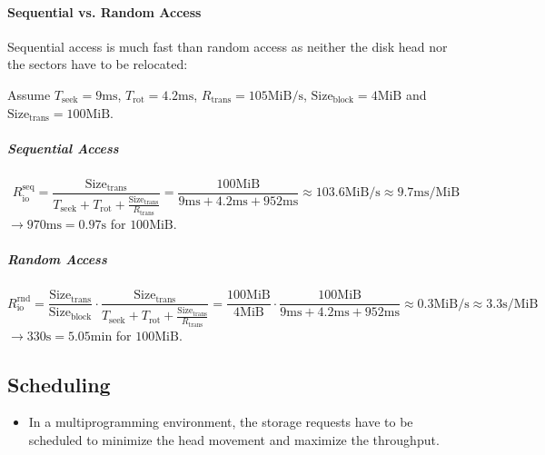 \documentclass[a4paper, 11pt, accentcolor = tud3b]{tudreport}
\begin{document}
		        \paragraph{Sequential vs. Random Access}
			        Sequential access is much fast than random access as neither the disk head nor the sectors have to be relocated:
			        
			        Assume \( T_\textrm{seek} = 9\textrm{ms} \), \( T_\textrm{rot} = 4.2\textrm{ms} \), \( R_\textrm{trans} = 105\textrm{MiB/s} \), \( \textrm{Size}_\textrm{block} = 4\textrm{MiB} \) and \( \textrm{Size}_\textrm{trans} = 100\textrm{MiB} \).
			        
			        \subparagraph{Sequential Access}
			        \begin{equation*}
				        R_\textrm{io}^\textrm{seq} = \frac{\textrm{Size}_\textrm{trans}}{T_\textrm{seek} + T_\textrm{rot} + \frac{\textrm{Size}_\textrm{trans}}{R_\textrm{trans}}} = \frac{100\textrm{MiB}}{9\textrm{ms} + 4.2\textrm{ms} + 952\textrm{ms}} \approx 103.6\textrm{MiB/s} \approx 9.7\textrm{ms/MiB}
			        \end{equation*}
			        \( \rightarrow 970\textrm{ms} = 0.97\textrm{s} \) for \( 100\textrm{MiB} \).
			        
			        \subparagraph{Random Access}
			        \begin{equation*}
				        R_\textrm{io}^\textrm{rnd} = \frac{\textrm{Size}_\textrm{trans}}{\textrm{Size}_\textrm{block}} \cdot \frac{\textrm{Size}_\textrm{trans}}{T_\textrm{seek} + T_\textrm{rot} + \frac{\textrm{Size}_\textrm{trans}}{R_\textrm{trans}}} = \frac{100\textrm{MiB}}{4\textrm{MiB}} \cdot \frac{100\textrm{MiB}}{9\textrm{ms} + 4.2\textrm{ms} + 952\textrm{ms}} \approx 0.3\textrm{MiB/s} \approx 3.3\textrm{s/MiB}
			        \end{equation*}
			        \( \rightarrow 330\textrm{s} = 5.05\textrm{min} \) for \( 100\textrm{MiB} \).
	        
	        \subsection{Scheduling}
		        \begin{itemize}
		        	\item In a multiprogramming environment, the storage requests have to be scheduled to minimize the head movement and maximize the throughput.
		        \end{itemize}
		        
\end{document}
